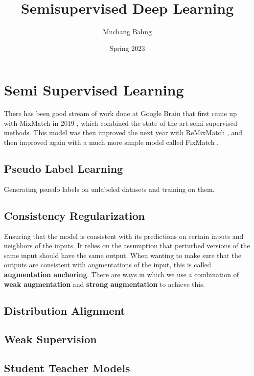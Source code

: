 \documentclass{article}
\begin{document}

\title{Semisupervised Deep Learning}
\author{Muchang Bahng}
\date{Spring 2023}

\maketitle
\tableofcontents
\pagebreak 




\section{Semi Supervised Learning} 

  There has been good stream of work done at Google Brain that first came up with MixMatch in 2019 \cite{berthelot2019mixmatch}, which combined the state of the art semi supervised methods. This model was then improved the next year with ReMixMatch \cite{berthelot2020remixmatch}, and then improved again with a much more simple model called FixMatch \cite{sohn2020fixmatch}. 

  \subsection{Pseudo Label Learning} 
    
    Generating psuedo labels on unlabeled datasets and training on them. 

  \subsection{Consistency Regularization}
    
    Ensuring that the model is consistent with its predictions on certain inputs and neighbors of the inputs. It relies on the assumption that perturbed versions of the same input should have the same output. When wanting to make sure that the outputs are consistent with augmentations of the input, this is called \textbf{augmentation anchoring}. There are ways in which we use a combination of \textbf{weak augmentation} and \textbf{strong augmentation} to achieve this. 

  \subsection{Distribution Alignment}

  \subsection{Weak Supervision} 

  \subsection{Student Teacher Models} 



\end{document}
